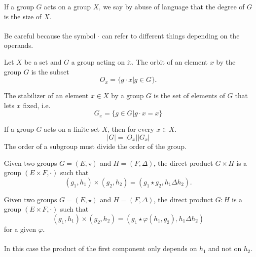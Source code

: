 \begin{definition}[Degree]
  If a group $G$ acts on a group $X$, we say by abuse of language that the degree of $G$ is the size of $X$.
\end{definition}

\paragraph{}
Be careful because the symbol $\cdot$ can refer to different things depending on the operands.

\begin{definition}
  Let $X$ be a set and $G$ a group acting on it.
  The orbit of an element $x$ by the group $G$ is the subset
  \[
    O_x = \{g \cdot x | g \in G\}.
  \]
\end{definition}

\begin{definition}
  The stabilizer of an element $x\in X$ by a group $G$ is the set of elements of $G$ that lets $x$ fixed, i.e.
  \[
    G_x = \{g \in G | g \cdot x = x\}
  \]
\end{definition}

\begin{property}
  \label{orbit-stabilizer}
  If a group $G$ acts on a finite set $X$, then for every $x \in X$.
  \[
    |G| = |O_x||G_x|
  \]
  The order of a subgroup must divide the order of the group.
\end{property}

\begin{definition}
  Given two groups $G = (E, \star)$ and $H = (F, \Delta)$, the direct product $G \times H$ is a group $(E \times F, \cdot)$ such that
  \[
    (g_1, h_1) \times (g_2, h_2) = (g_1 \star g_2, h_1 \Delta h_2).
  \]
\end{definition}

\begin{definition}
  Given two groups $G = (E, \star)$ and $H = (F, \Delta)$, the direct product $G : H$ is a group $(E \times F, \cdot)$ such that
  \[
    (g_1, h_1) \times (g_2, h_2) = (g_1 \star \varphi(h_1,g_2), h_1 \Delta h_2)
  \]
  for a given $\varphi$.

  \paragraph{}
  In this case the product of the first component only depends on $h_1$ and not on $h_2$.
\end{definition}

